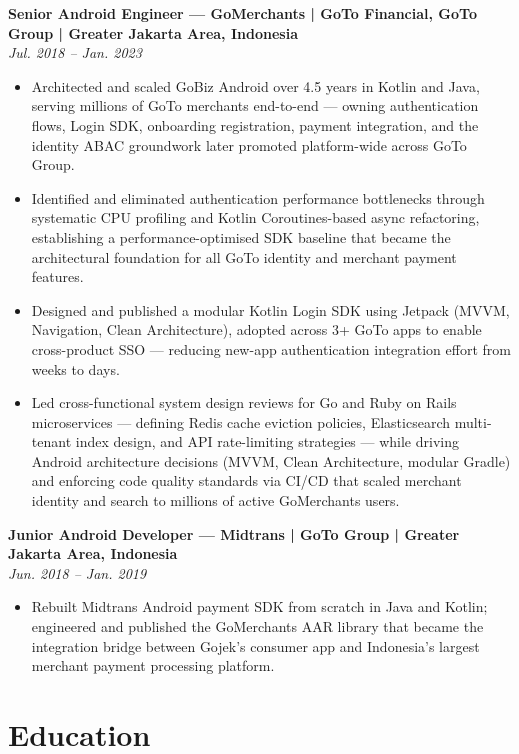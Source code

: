 \documentclass[10pt]{article}
\begin{document}
\smallskip
\textbf{Senior Android Engineer --- GoMerchants | GoTo Financial, GoTo Group | Greater Jakarta Area, Indonesia}\\
\textit{Jul. 2018 -- Jan. 2023}
\begin{itemize}
\item Architected and scaled GoBiz Android over 4.5 years in Kotlin and Java, serving millions of GoTo merchants end-to-end --- owning authentication flows, Login SDK, onboarding registration, payment integration, and the identity ABAC groundwork later promoted platform-wide across GoTo Group.
\item Identified and eliminated authentication performance bottlenecks through systematic CPU profiling and Kotlin Coroutines-based async refactoring, establishing a performance-optimised SDK baseline that became the architectural foundation for all GoTo identity and merchant payment features.
\item Designed and published a modular Kotlin Login SDK using Jetpack (MVVM, Navigation, Clean Architecture), adopted across 3+ GoTo apps to enable cross-product SSO --- reducing new-app authentication integration effort from weeks to days.
\item Led cross-functional system design reviews for Go and Ruby on Rails microservices --- defining Redis cache eviction policies, Elasticsearch multi-tenant index design, and API rate-limiting strategies --- while driving Android architecture decisions (MVVM, Clean Architecture, modular Gradle) and enforcing code quality standards via CI/CD that scaled merchant identity and search to millions of active GoMerchants users.
\end{itemize}

\smallskip
\textbf{Junior Android Developer --- Midtrans | GoTo Group | Greater Jakarta Area, Indonesia}\\
\textit{Jun. 2018 -- Jan. 2019}
\begin{itemize}
\item Rebuilt Midtrans Android payment SDK from scratch in Java and Kotlin; engineered and published the GoMerchants AAR library that became the integration bridge between Gojek's consumer app and Indonesia's largest merchant payment processing platform.
\end{itemize}

\section*{Education}
\end{document}
